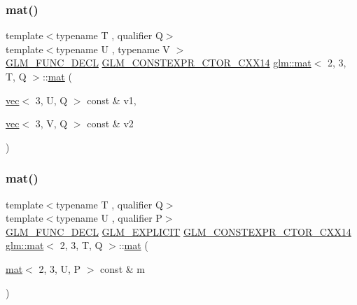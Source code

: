 \mbox{\label{structglm_1_1mat_3_012_00_013_00_01_t_00_01_q_01_4_adac199e52e2fbdfe33f528a5aef395bc}} 
\subsubsection{\texorpdfstring{mat()}{mat()}\hspace{0.1cm}{\footnotesize\ttfamily [8/21]}}
{\footnotesize\ttfamily template$<$typename T , qualifier Q$>$ \\
template$<$typename U , typename V $>$ \\
\hyperlink{setup_8hpp_ab2d052de21a70539923e9bcbf6e83a51}{G\+L\+M\+\_\+\+F\+U\+N\+C\+\_\+\+D\+E\+CL} \hyperlink{setup_8hpp_a0900f9145e68bf6061b6f5e7be3fa751}{G\+L\+M\+\_\+\+C\+O\+N\+S\+T\+E\+X\+P\+R\+\_\+\+C\+T\+O\+R\+\_\+\+C\+X\+X14} \hyperlink{structglm_1_1mat}{glm\+::mat}$<$ 2, 3, T, Q $>$\+::\hyperlink{structglm_1_1mat}{mat} (\begin{DoxyParamCaption}\item[{\hyperlink{structglm_1_1vec}{vec}$<$ 3, U, Q $>$ const \&}]{v1,  }\item[{\hyperlink{structglm_1_1vec}{vec}$<$ 3, V, Q $>$ const \&}]{v2 }\end{DoxyParamCaption})}

\mbox{\label{structglm_1_1mat_3_012_00_013_00_01_t_00_01_q_01_4_a1c561950eeef2c86735f4c6a65a8f1d8}} 
\subsubsection{\texorpdfstring{mat()}{mat()}\hspace{0.1cm}{\footnotesize\ttfamily [9/21]}}
{\footnotesize\ttfamily template$<$typename T , qualifier Q$>$ \\
template$<$typename U , qualifier P$>$ \\
\hyperlink{setup_8hpp_ab2d052de21a70539923e9bcbf6e83a51}{G\+L\+M\+\_\+\+F\+U\+N\+C\+\_\+\+D\+E\+CL} \hyperlink{setup_8hpp_a6c74f5a5e7b134ab69023ff9a30d4d5d}{G\+L\+M\+\_\+\+E\+X\+P\+L\+I\+C\+IT} \hyperlink{setup_8hpp_a0900f9145e68bf6061b6f5e7be3fa751}{G\+L\+M\+\_\+\+C\+O\+N\+S\+T\+E\+X\+P\+R\+\_\+\+C\+T\+O\+R\+\_\+\+C\+X\+X14} \hyperlink{structglm_1_1mat}{glm\+::mat}$<$ 2, 3, T, Q $>$\+::\hyperlink{structglm_1_1mat}{mat} (\begin{DoxyParamCaption}\item[{\hyperlink{structglm_1_1mat}{mat}$<$ 2, 3, U, P $>$ const \&}]{m }\end{DoxyParamCaption})}

